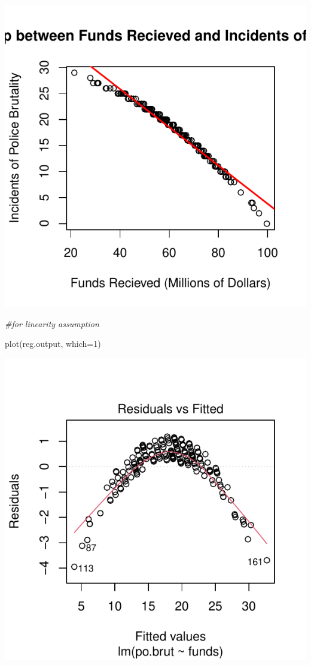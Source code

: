 \documentclass[
]{article}
\newenvironment{Shaded}{\begin{snugshade}}{\end{snugshade}}
\newcommand{\AttributeTok}[1]{\textcolor[rgb]{0.77,0.63,0.00}{#1}}
\newcommand{\CommentTok}[1]{\textcolor[rgb]{0.56,0.35,0.01}{\textit{#1}}}
\newcommand{\DecValTok}[1]{\textcolor[rgb]{0.00,0.00,0.81}{#1}}
\newcommand{\FunctionTok}[1]{\textcolor[rgb]{0.00,0.00,0.00}{#1}}
\newcommand{\NormalTok}[1]{#1}
\begin{document}
\includegraphics{Assignments_files/figure-latex/unnamed-chunk-36-1.pdf}

\begin{Shaded}
\begin{Highlighting}[]
\CommentTok{\#for linearity assumption}

\FunctionTok{plot}\NormalTok{(reg.output, }\AttributeTok{which=}\DecValTok{1}\NormalTok{)}
\end{Highlighting}
\end{Shaded}

\includegraphics{Assignments_files/figure-latex/unnamed-chunk-36-2.pdf}
\end{document}
